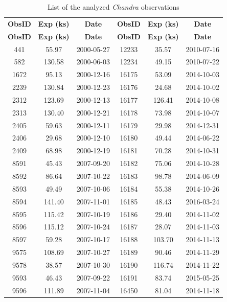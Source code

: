 \documentclass[pdflatex,sn-mathphys-num]{sn-jnl}
\theoremstyle{thmstyleone}
\theoremstyle{thmstyletwo}
\theoremstyle{thmstylethree}
\begin{document}
\renewcommand{\arraystretch}{1}
\begin{longtable}{ccc|ccc}
\captionsetup{name=Extended Data Table}
\caption{List of the analyzed \textit{Chandra} observations}
\label{tab:obsids} \\
\hline
\textbf{ObsID} & \textbf{Exp (ks)} & \textbf{Date} & \textbf{ObsID} & \textbf{Exp (ks)} & \textbf{Date} \\
\hline
\endfirsthead

\hline
\textbf{ObsID} & \textbf{Exp (ks)} & \textbf{Date} & \textbf{ObsID} & \textbf{Exp (ks)} & \textbf{Date} \\
\hline
\endhead
\hline
441   & 55.97  & 2000-05-27 & 12233 & 35.57  & 2010-07-16  \\
582   & 130.58 & 2000-06-03 & 12234 & 49.15  & 2010-07-22  \\
1672  & 95.13  & 2000-12-16 & 16175 & 53.09  & 2014-10-03  \\
2239  & 130.84 & 2000-12-23 & 16176 & 24.68  & 2014-10-02  \\
2312  & 123.69 & 2000-12-13 & 16177 & 126.41 & 2014-10-08  \\
2313  & 130.40 & 2000-12-21 & 16178 & 73.98  & 2014-10-07  \\
2405  & 59.63  & 2000-12-11 & 16179 & 29.98  & 2014-12-31  \\
2406  & 29.68  & 2000-12-10 & 16180 & 49.44  & 2014-06-22  \\
2409  & 68.98  & 2000-12-19 & 16181 & 70.28  & 2014-10-31  \\
8591  & 45.43  & 2007-09-20 & 16182 & 75.06  & 2014-10-28  \\
8592  & 86.64  & 2007-10-22 & 16183 & 98.78  & 2014-06-09  \\
8593  & 49.49  & 2007-10-06 & 16184 & 55.38  & 2014-10-26  \\
8594  & 141.40 & 2007-11-01 & 16185 & 48.43  & 2016-03-24  \\
8595  & 115.42 & 2007-10-19 & 16186 & 29.40  & 2014-11-02  \\
8596  & 115.12 & 2007-10-24 & 16187 & 28.07  & 2014-11-03  \\
8597  & 59.28  & 2007-10-17 & 16188 & 103.70 & 2014-11-13  \\
9575  & 108.69 & 2007-10-27 & 16189 & 90.46  & 2014-11-29  \\
9578  & 38.57  & 2007-10-30 & 16190 & 116.74 & 2014-11-22  \\
9593  & 46.43  & 2007-09-22 & 16191 & 83.74  & 2015-05-25  \\
9596  & 111.89 & 2007-11-04 & 16450 & 81.04  & 2014-11-18  \\

\end{longtable}
\end{document}

